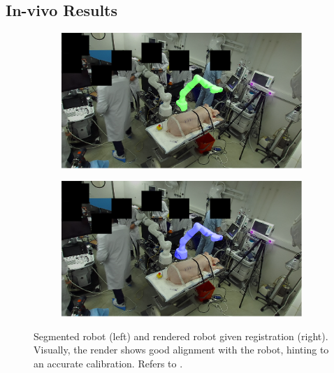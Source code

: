 




\subsection{In-vivo Results}
\label{c1:sec:in_vivo_results}
\begin{figure}[tb]
    \centering
    \begin{subfigure}[b]{0.49\textwidth}
        \centering
        \includegraphics[width=\textwidth]{chapter_1/img/left_mask_overlay_0_anonymized.png}
    \end{subfigure}
    \begin{subfigure}[b]{0.49\textwidth}
        \includegraphics[width=\textwidth]{chapter_1/img/left_render_0_anonymized.png}
    \end{subfigure}
    \caption{Segmented robot (left) and rendered robot given registration (right). Visually, the render shows good alignment with the robot, hinting to an accurate calibration. Refers to .}
    \label{c1:fig:in_vivo_results}
\end{figure}
